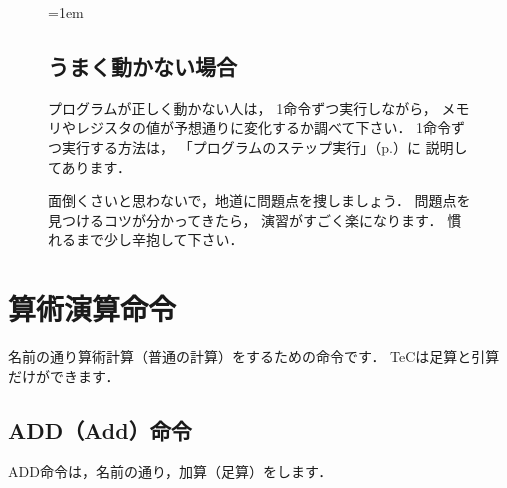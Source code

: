 \begin{figure}[btp]
  \begin{framed}{\parindent=1em
      \subsection*{うまく動かない場合}
      プログラムが正しく動かない人は，
      1命令ずつ実行しながら，
      メモリやレジスタの値が予想通りに変化するか調べて下さい．
      1命令ずつ実行する方法は，%
      「プログラムのステップ実行」（p.\pageref{step}）に
      説明してあります．

      面倒くさいと思わないで，地道に問題点を捜しましょう．
      問題点を見つけるコツが分かってきたら，
      演習がすごく楽になります．
      慣れるまで少し辛抱して下さい．
  }\end{framed}
\end{figure}

\newpage
\section{算術演算命令}

名前の通り算術計算（普通の計算）をするための命令です．
TeCは足算と引算だけができます．

\subsection{ADD（Add）命令}
ADD命令は，名前の通り，加算（足算）をします．

